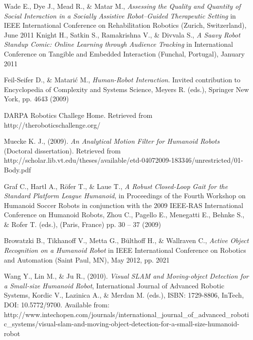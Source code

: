 \begin{thebibliography}{99}

	Wade E., Dye J., Mead R., \& Matar M.,
	\emph{Assessing the Quality and Quantity of Social Interaction in a Socially Assistive Robot{--}Guided Therapeutic Setting}
	in IEEE International Conference on Rehabilitation Robotics
	(Zurich, Switzerland),
	June 2011
	Knight H., Satkin S., Ramakrishna V., \& Divvala S.,
	\emph{A Saavy Robot Standup Comic{:} Online Learning through Audience Tracking}
	in International Conference on Tangible and Embedded Interaction
	(Funchal, Portugal),
	January 2011

	Feil-Seifer D., \& Matari\'{c} M.,
	\emph{Human-Robot Interaction}. 
	Invited contribution to Encyclopedia of Complexity and Systems Science,
	Meyers R. (eds.),
	Springer New York,
	pp. 4643
	(2009) 

	DARPA Robotics Challege Home.
	Retrieved from http://theroboticschallenge.org/

	Muecke K. J.,
	(2009).
	\emph{An Analytical Motion Filter for Humanoid Robots}
	(Doctoral dissertation).
	Retrieved from
	http://scholar.lib.vt.edu/theses/available/etd-04072009-183346/unrestricted/01-Body.pdf

	Graf C., Hartl A., R\"{o}fer T., \& Laue T., 
	\emph{A Robust Closed-Loop Gait for the Standard Platform League Humanoid},
	in Proceedings of the Fourth Workshop on Humanoid Soccer Robots 
	in conjunction with the 2009 IEEE-RAS International Conference on Humanoid Robots, 
	Zhou C., Pagello E., Menegatti E., Behnke S., \& Rofer T. (eds.), 
	(Paris, France)
	pp. 30 – 37
	(2009)

	Browatzki B., Tikhanoff V., Metta G., B\"{u}lthoff H., \& Wallraven C.,
	\emph{Active Object Recognition on a Humanoid Robot}
	in IEEE International Conference on Robotics and Automation
	(Saint Paul, MN),
	May 2012,
	pp. 2021

	Wang Y., Lin M., \& Ju R.,
	(2010). 
	\emph{Visual SLAM and Moving-object Detection for a Small-size Humanoid Robot}, 
	International Journal of Advanced Robotic Systems, 
	Kordic V., Lazinica A., \& Merdan M. (eds.), 
	ISBN: 1729-8806, 
	InTech, DOI: 10.5772/9700. 
	Available from: http://www.intechopen.com/journals/international\_journal\_of\_advanced\_robotic\_systems/visual-slam-and-moving-object-detection-for-a-small-size-humanoid-robot


\end{thebibliography}

